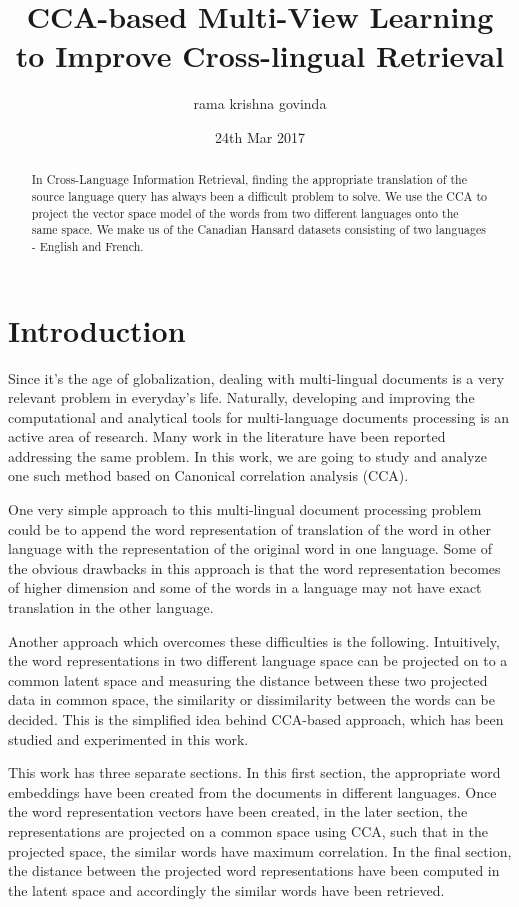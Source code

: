 \documentclass{article} %
\title{CCA-based Multi-View Learning to Improve Cross-lingual Retrieval}
\begin{document}
\author{rama krishna govinda}
\date{24th Mar 2017}
	
	
	\maketitle
	
	\begin{abstract}
		In Cross-Language Information Retrieval, finding the appropriate translation of the source language query has always been a difficult problem to solve. We use the CCA to project the  vector space model of the words from two different languages onto the same space. We make us of the Canadian Hansard datasets consisting of two languages - English and French.
	\end{abstract}
	
	\section{Introduction}
	
	Since it's the age of globalization, dealing with multi-lingual documents is a very relevant problem in everyday's life. Naturally, developing and improving the computational and analytical tools for multi-language documents processing is an active area of research. Many work in the literature have been reported addressing the same problem. In this work, we are going to study and analyze one such method based on Canonical correlation analysis (CCA).
	
	One very simple approach to this multi-lingual document processing problem could be to append the word representation of translation of the word in other language with the representation of the original word in one language. Some of the obvious drawbacks in this approach is that the word representation becomes of higher dimension and some of the words in a language may not have exact translation in the other language.
	
	Another approach which overcomes these difficulties is the following. Intuitively, the word representations in two different language space can be projected on to a common latent space and measuring the distance between these two projected data in common space, the similarity or dissimilarity between the words can be decided. This is the simplified idea behind CCA-based approach, which has been studied and experimented in this work.
	
	This work has three separate sections. In this first section, the appropriate word embeddings have been created from the documents in different languages. Once the word representation vectors have been created, in the later section, the representations are projected on a common space using CCA, such that in the projected space, the similar words have maximum correlation. In the final section, the distance between the projected word representations have been computed in the latent space and accordingly the similar words have been retrieved.
	
\end{document}
